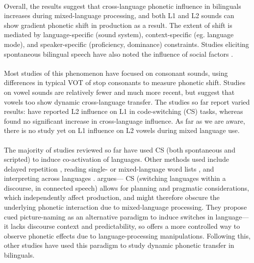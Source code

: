 \documentclass[11pt]{article}
\begin{document}
\paragraph{}Overall, the results suggest that cross-language phonetic influence in bilinguals increases during mixed-language processing, and both L1 and L2 sounds can show gradient phonetic shift in production as a result. The extent of shift is mediated by language-specific (sound system), context-specific (eg. language mode), and speaker-specific (proficiency, dominance) constraints. Studies eliciting spontaneous bilingual speech have also noted the influence of social factors \cite{khattab2009phonetic}. 

\paragraph{}Most studies of this phenomenon have focused on consonant sounds, using differences in typical VOT of stop consonants to measure phonetic shift. Studies on vowel sounds are relatively fewer and much more recent, but suggest that vowels too show dynamic cross-language transfer. The studies so far report varied results:  have reported L2 influence on L1 in code-switching (CS) tasks, whereas  found no significant increase in cross-language influence. As far as we are aware, there is no study yet on L1 influence on L2 vowels during mixed language use.

\paragraph{}The majority of studies reviewed so far have used CS (both spontaneous and scripted) to induce co-activation of languages. Other methods used include delayed repetition \cite{simonet2014phonetic}, reading single- or mixed-language word lists \cite{simonet2020increased}, and interpreting across languages \cite{vsimavckova2015immediate,vsimavckova2018patterns}.  argues— CS (switching languages within a discourse, in connected speech) allows for planning and pragmatic considerations, which independently affect production, and might therefore obscure the underlying phonetic interaction due to mixed-language processing. They propose cued picture-naming as an alternative paradigm to induce switches in language—it lacks discourse context and predictability, so offers a more controlled way to observe phonetic effects due to language-processing manipulations. Following this, other studies \cite{goldrick2014language,tsui2019impact} have used this paradigm to study dynamic phonetic transfer in bilinguals.
\end{document}
